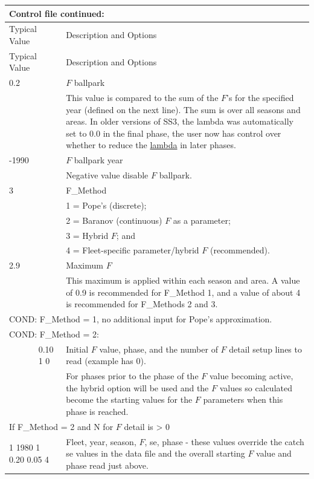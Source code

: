 \begin{longtable}{p{1cm} p{3cm} p{11cm}}
	\multicolumn{3}{l}{Control file continued:} \\
	\hline
	\multicolumn{2}{l}{Typical Value} & Description and Options \Tstrut\Bstrut\\
	\hline
	\endfirsthead

	\hline
	\multicolumn{2}{l}{Typical Value} & Description and Options \Tstrut\Bstrut\\
	\hline
	\endhead

	\hline
	\endfoot
	\endlastfoot

	0.2 \Tstrut & & $F$ ballpark \\
		& & This value is compared to the sum of the $F$'s for the specified year (defined on the next line). The sum is over all seasons and areas. In older versions of SS3, the lambda was automatically set to 0.0 in the final phase, the user now has control over whether to reduce the \hyperlink{Lambdas}{lambda} in later phases. \Bstrut\\
	\hline

	-1990\Tstrut & & $F$ ballpark year \\
		& & Negative value disable $F$ ballpark. \Bstrut\\
	\hline

	3 \Tstrut & & F\_Method \\
	   & & 1 = Pope's (discrete); \\
	   & & 2 = Baranov (continuous) $F$ as a parameter; \\
	   & & 3 = Hybrid $F$; and \\
	   & & 4 = Fleet-specific parameter/hybrid $F$ (recommended). \Bstrut\\
	\hline

	2.9 \Tstrut & & Maximum $F$ \\
	 & & This maximum is applied within each season and area. A value of 0.9 is recommended for F\_Method 1, and a value of about 4 is recommended for F\_Methods 2 and 3. \Bstrut\\
	\hline

	\multicolumn{3}{l}{COND: F\_Method = 1, no additional input for Pope's approximation.} \Tstrut\Bstrut\\
	\hline

	\multicolumn{3}{l}{COND: F\_Method = 2:} \Tstrut\\
	& 0.10 1 0 & Initial $F$ value, phase, and the number of $F$ detail setup lines to read (example has 0). \\
	&  & For phases prior to the phase of the $F$ value becoming active, the hybrid option will be used and the $F$ values so calculated become the starting values for the $F$ parameters when this phase is reached. \\
	\multicolumn{3}{l}{If F\_Method = 2 and N for $F$ detail is > 0} \Tstrut\\
	\multicolumn{2}{l}{1 1980 1 0.20 0.05 4} & Fleet, year, season, $F$, \gls{se}, phase - these values override the catch \gls{se} values in the data file and the overall starting $F$ value and phase read just above. \Bstrut\\
	\hline


\end{longtable}
